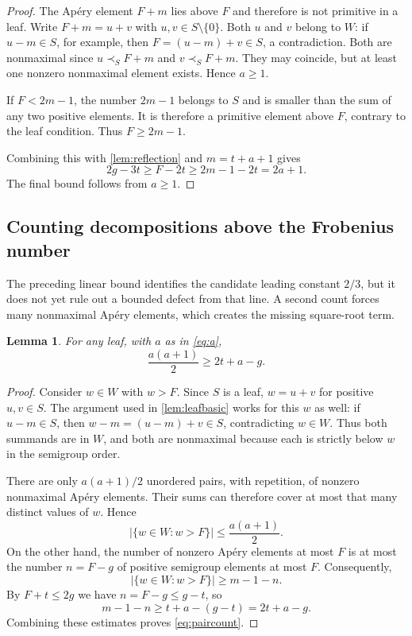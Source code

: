 \documentclass[11pt,letterpaper]{article}
\numberwithin{equation}{section}
\newtheorem{lemma}[theorem]{Lemma}
\theoremstyle{definition}
\theoremstyle{remark}
\begin{document}
\begin{proof}
The Ap\'ery element $F+m$ lies above $F$ and therefore is not primitive in
a leaf. Write $F+m=u+v$ with $u,v\in S\setminus\{0\}$.
Both $u$ and $v$ belong to $W$: if $u-m\in S$, for example, then
$F=(u-m)+v\in S$, a contradiction. Both are nonmaximal since
$u\prec_S F+m$ and $v\prec_S F+m$. They may coincide, but at least one
nonzero nonmaximal element exists. Hence $a\ge1$.

If $F<2m-1$, the number $2m-1$ belongs to $S$ and is smaller than the sum of
any two positive elements. It is therefore a primitive element above $F$,
contrary to the leaf condition. Thus $F\ge2m-1$.

Combining this with \cref{lem:reflection} and $m=t+a+1$ gives
\[
 2g-3t\ge F-2t\ge2m-1-2t=2a+1.
\]
The final bound follows from $a\ge1$.
\end{proof}

\subsection{Counting decompositions above the Frobenius number}

The preceding linear bound identifies the candidate leading constant $2/3$,
but it does not yet rule out a bounded defect from that line. A second count
forces many nonmaximal Ap\'ery elements, which creates the missing
square-root term.

\begin{lemma}\label{lem:paircount}
For any leaf, with $a$ as in \eqref{eq:a},
\begin{equation}\label{eq:paircount}
 \frac{a(a+1)}2\ge2t+a-g.
\end{equation}
\end{lemma}

\begin{proof}
Consider $w\in W$ with $w>F$. Since $S$ is a leaf, $w=u+v$ for positive
$u,v\in S$. The argument used in \cref{lem:leafbasic} works for this $w$
as well: if $u-m\in S$, then $w-m=(u-m)+v\in S$, contradicting $w\in W$.
Thus both summands are in $W$, and both are nonmaximal because each is
strictly below $w$ in the semigroup order.

There are only $a(a+1)/2$ unordered pairs, with repetition, of nonzero
nonmaximal Ap\'ery elements. Their sums can therefore cover at most that
many distinct values of $w$. Hence
\[
 |\{w\in W:w>F\}|\le\frac{a(a+1)}2.
\]
On the other hand, the number of nonzero Ap\'ery elements at most $F$
is at most the number $n=F-g$ of positive semigroup elements at most $F$.
Consequently,
\[
 |\{w\in W:w>F\}|\ge m-1-n.
\]
By $F+t\le2g$ we have $n=F-g\le g-t$, so
\[
 m-1-n\ge t+a-(g-t)=2t+a-g.
\]
Combining these estimates proves \eqref{eq:paircount}.
\end{proof}
\end{document}
